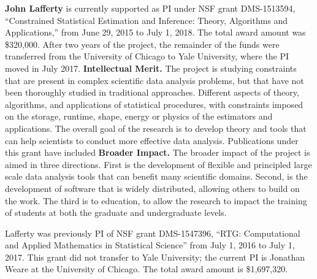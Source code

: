 \vskip10pt \textbf{John Lafferty} is currently supported as PI under NSF
grant DMS-1513594, ``Constrained Statistical Estimation and Inference:
Theory, Algorithms and Applications,'' from June 29, 2015 to July 1,
2018. The total award amount was \$320,000. After two years of the
project, the remainder of the funds were transferred from the
University of Chicago to Yale University, where the PI moved in July
2017.
{\bf Intellectual Merit.}  The project is studying constraints that
are present in complex scientific data analysis problems, but that
have not been thoroughly studied in traditional approaches. Different
aspects of theory, algorithms, and applications of statistical
procedures, with constraints imposed on the storage, runtime, shape,
energy or physics of the estimators and applications. The overall goal
of the research is to develop theory and tools that can help
scientists to conduct more effective data analysis. Publications under
this grant have included \citep{ChatterjeeL18,MishraILH18,
abs-1803-01302,MishraLH17,YangB0L16,ChatterjeeDLZ16,ZhengL16,
MishraZLH15,ZhengL15,ZhuL14,Bonak18}
{\bf Broader Impact.} The broader impact of the project is aimed in
three directions. First is the development of flexible and principled
large scale data analysis tools that can benefit many scientific
domains.  Second, is the development of software that is widely
distributed, allowing others to build on the work. The third is to
education, to allow the research to impact the training of students at
both the graduate and undergraduate levels.


\vskip10pt \noindent Lafferty was previously PI of NSF grant
DMS-1547396, ``RTG: Computational and Applied Mathematics in
Statistical Science'' from July 1, 2016 to July 1, 2017. This grant
did not transfer to Yale University; the current PI is Jonathan Weare
at the University of Chicago. The total award amount is \$1,697,320.

%

